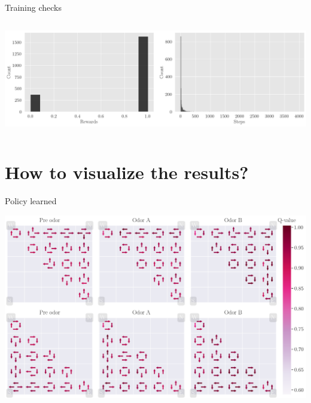 \documentclass[bigger]{beamer}
\begin{document}
\begin{frame}[label={sec:orgb59c4e4}]{Training checks}
\begin{columns}
\begin{column}[c]{0.5\columnwidth}
\begin{center}
\end{center}
\begin{center}
\includegraphics[width=\textwidth]{img/steps-and-rewards-distrib.png}
\end{center}
\end{column}
\end{columns}
\end{frame}
\section{How to visualize the results?}
\label{sec:orgdb0ffba}
\begin{frame}[label={sec:org7c5abed}]{Policy learned}
\begin{center}
\includegraphics[width=.9\linewidth]{img/policy.png}
\end{center}
\end{frame}
\end{document}
